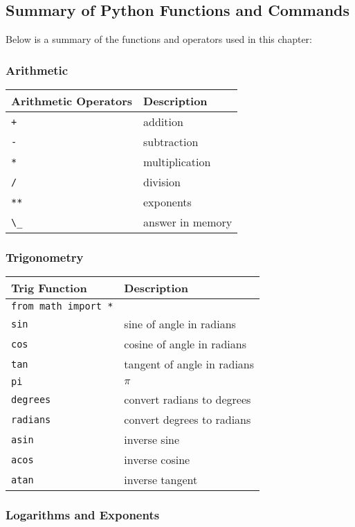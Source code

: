 \documentclass{book}
\newcommand{\passthrough}[1]{#1}
\begin{document}
    
        \hypertarget{summary-of-python-functions-and-commands}{%
\subsection{Summary of Python Functions and
Commands}\label{summary-of-python-functions-and-commands}}

Below is a summary of the functions and operators used in this chapter:

\hypertarget{arithmetic}{%
\subsubsection{Arithmetic}\label{arithmetic}}

\begin{longtable}[]{@{}ll@{}}
\toprule
Arithmetic Operators & Description\tabularnewline
\midrule
\endhead
\passthrough{\lstinline!+!} & addition\tabularnewline
\passthrough{\lstinline!-!} & subtraction\tabularnewline
\passthrough{\lstinline!*!} & multiplication\tabularnewline
\passthrough{\lstinline!/!} & division\tabularnewline
\passthrough{\lstinline!**!} & exponents\tabularnewline
\passthrough{\lstinline!\_!} & answer in memory\tabularnewline
\bottomrule
\end{longtable}

\hypertarget{trigonometry}{%
\subsubsection{Trigonometry}\label{trigonometry}}

\begin{longtable}[]{@{}ll@{}}
\toprule
Trig Function & Description\tabularnewline
\midrule
\endhead
\passthrough{\lstinline!from math import *!} &\tabularnewline
\passthrough{\lstinline!sin!} & sine of angle in radians\tabularnewline
\passthrough{\lstinline!cos!} & cosine of angle in
radians\tabularnewline
\passthrough{\lstinline!tan!} & tangent of angle in
radians\tabularnewline
\passthrough{\lstinline!pi!} & \(\pi\)\tabularnewline
\passthrough{\lstinline!degrees!} & convert radians to
degrees\tabularnewline
\passthrough{\lstinline!radians!} & convert degrees to
radians\tabularnewline
\passthrough{\lstinline!asin!} & inverse sine\tabularnewline
\passthrough{\lstinline!acos!} & inverse cosine\tabularnewline
\passthrough{\lstinline!atan!} & inverse tangent\tabularnewline
\bottomrule
\end{longtable}

\hypertarget{logarithms-and-exponents}{%
\subsubsection{Logarithms and
Exponents}\label{logarithms-and-exponents}}
\end{document}
